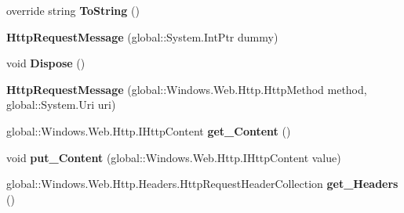\begin{DoxyCompactItemize}
\item 
\mbox{\label{class_windows_1_1_web_1_1_http_1_1_http_request_message_a311ec1966990d2a837636dfe734907f3}} 
override string {\bfseries To\+String} ()
\item 
\mbox{\label{class_windows_1_1_web_1_1_http_1_1_http_request_message_a266f73c079be0dd9c1b831b69dd1731e}} 
{\bfseries Http\+Request\+Message} (global\+::\+System.\+Int\+Ptr dummy)
\item 
\mbox{\label{class_windows_1_1_web_1_1_http_1_1_http_request_message_a45b7a3697d6f36e790546f21c5011670}} 
void {\bfseries Dispose} ()
\item 
\mbox{\label{class_windows_1_1_web_1_1_http_1_1_http_request_message_a59606adfc5f01047a058c7802520488d}} 
{\bfseries Http\+Request\+Message} (global\+::\+Windows.\+Web.\+Http.\+Http\+Method method, global\+::\+System.\+Uri uri)
\item 
\mbox{\label{class_windows_1_1_web_1_1_http_1_1_http_request_message_a2d95b5c161ea61544f6c82430b9bef3d}} 
global\+::\+Windows.\+Web.\+Http.\+I\+Http\+Content {\bfseries get\+\_\+\+Content} ()
\item 
\mbox{\label{class_windows_1_1_web_1_1_http_1_1_http_request_message_aef2c0a57c9fe364d410c4ea568aa1406}} 
void {\bfseries put\+\_\+\+Content} (global\+::\+Windows.\+Web.\+Http.\+I\+Http\+Content value)
\item 
\mbox{\label{class_windows_1_1_web_1_1_http_1_1_http_request_message_a7954249df0daf81ada6573d24a237db8}} 
global\+::\+Windows.\+Web.\+Http.\+Headers.\+Http\+Request\+Header\+Collection {\bfseries get\+\_\+\+Headers} ()
\item 
\mbox{\label{class_windows_1_1_web_1_1_http_1_1_http_request_message_a4e6485899f5654f598f0911225702f86}} 

\end{DoxyCompactItemize}
